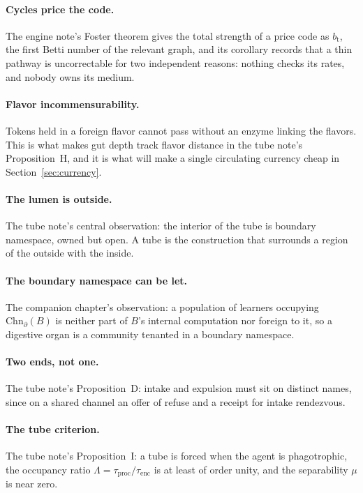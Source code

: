 \documentclass[11pt]{article}
\theoremstyle{plain}
\theoremstyle{definition}
\newcommand{\Chn}{\mathrm{Chn}}
\newcommand{\bt}{b_{\mathrm{t}}}
\begin{document}
\paragraph{Cycles price the code.} The engine note's Foster theorem gives the total strength of a
price code as $\bt$, the first Betti number of the relevant graph, and its corollary records that a
thin pathway is uncorrectable for two independent reasons: nothing checks its rates, and nobody owns
its medium.

\paragraph{Flavor incommensurability.} Tokens held in a foreign flavor cannot pass without an enzyme
linking the flavors. This is what makes gut depth track flavor distance in the tube note's
Proposition~H, and it is what will make a single circulating currency cheap in
Section~\ref{sec:currency}.

\paragraph{The lumen is outside.} The tube note's central observation: the interior of the tube is
boundary namespace, owned but open. A tube is the construction that surrounds a region of the outside
with the inside.

\paragraph{The boundary namespace can be let.} The companion chapter's observation: a population of
learners occupying $\Chn_{\partial}(B)$ is neither part of $B$'s internal computation nor foreign to
it, so a digestive organ is a community tenanted in a boundary namespace.

\paragraph{Two ends, not one.} The tube note's Proposition~D: intake and expulsion must sit on
distinct names, since on a shared channel an offer of refuse and a receipt for intake rendezvous.

\paragraph{The tube criterion.} The tube note's Proposition~I: a tube is forced when the agent is
phagotrophic, the occupancy ratio $\Lambda = \tau_{\mathrm{proc}}/\tau_{\mathrm{enc}}$ is at least of
order unity, and the separability $\mu$ is near zero.
\end{document}
